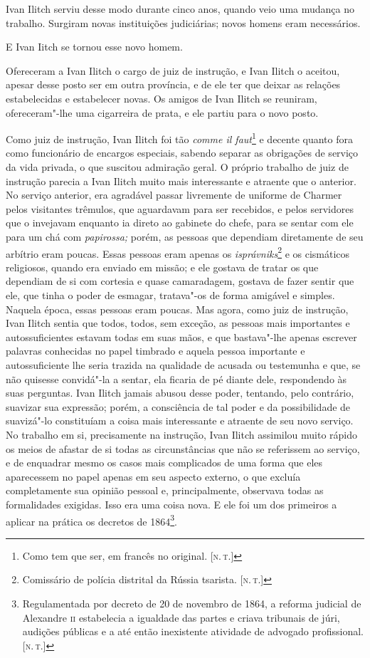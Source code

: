 Ivan Ilitch serviu desse modo durante cinco anos, quando veio uma
mudança no trabalho. Surgiram novas instituições judiciárias; novos
homens eram necessários.

E Ivan Iitch se tornou esse novo homem.

Ofereceram a Ivan Ilitch o cargo de juiz de instrução, e Ivan Ilitch o
aceitou, apesar desse posto ser em outra província, e de ele ter que
deixar as relações estabelecidas e estabelecer novas. Os amigos de Ivan
Ilitch se reuniram, ofereceram"-lhe uma cigarreira de prata, e ele partiu
para o novo posto.

Como juiz de instrução, Ivan Ilitch foi tão \emph{comme il
faut}\footnote{Como tem que ser, em francês no original. {[}\textsc{n.\,t.}{]}} e
decente quanto fora como funcionário de encargos especiais, sabendo
separar as obrigações de serviço da vida privada, o que suscitou
admiração geral. O próprio trabalho de juiz de instrução parecia a Ivan
Ilitch muito mais interessante e atraente que o anterior. No serviço
anterior, era agradável passar livremente de uniforme de Charmer pelos
visitantes trêmulos, que aguardavam para ser recebidos, e pelos
servidores que o invejavam enquanto ia direto ao gabinete do chefe, para
se sentar com ele para um chá com \emph{papirossa;} porém, as pessoas
que dependiam diretamente de seu arbítrio eram poucas. Essas pessoas
eram apenas os \emph{isprávniks}\footnote{Comissário de polícia
  distrital da Rússia tsarista. {[}\textsc{n.\,t.}{]}} e os cismáticos religiosos,
quando era enviado em missão; e ele gostava de tratar os que dependiam
de si com cortesia e quase camaradagem, gostava de fazer sentir que ele,
que tinha o poder de esmagar, tratava"-os de forma amigável e simples.
Naquela época, essas pessoas eram poucas. Mas agora, como juiz de
instrução, Ivan Ilitch sentia que todos, todos, sem exceção, as pessoas
mais importantes e autossuficientes estavam todas em suas mãos, e que
bastava"-lhe apenas escrever palavras conhecidas no papel timbrado e
aquela pessoa importante e autossuficiente lhe seria trazida na
qualidade de acusada ou testemunha e que, se não quisesse convidá"-la a
sentar, ela ficaria de pé diante dele, respondendo às suas perguntas.
Ivan Ilitch jamais abusou desse poder, tentando, pelo contrário,
suavizar sua expressão; porém, a consciência de tal poder e da
possibilidade de suavizá"-lo constituíam a coisa mais interessante e
atraente de seu novo serviço. No trabalho em si, precisamente na
instrução, Ivan Ilitch assimilou muito rápido os meios de afastar de si
todas as circunstâncias que não se referissem ao serviço, e de enquadrar
mesmo os casos mais complicados de uma forma que eles aparecessem no
papel apenas em seu aspecto externo, o que excluía completamente sua
opinião pessoal e, principalmente, observava todas as formalidades
exigidas. Isso era uma coisa nova. E ele foi um dos primeiros a aplicar
na prática os decretos de 1864\footnote{Regulamentada por decreto de 20
  de novembro de 1864, a reforma judicial de Alexandre \textsc{ii} estabelecia a
  igualdade das partes e criava tribunais de júri, audições públicas e a
  até então inexistente atividade de advogado profissional. {[}\textsc{n.\,t.}{]}}.

